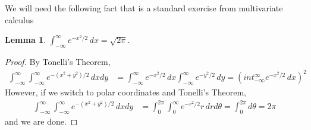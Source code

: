 \documentclass{amsart}
\newtheorem{lem}[thm]{Lemma}
\theoremstyle{remark}
\theoremstyle{definition}
\begin{document}
We will need the following fact that is a standard exercise from multivariate calculus
\begin{lem}\label{IntegralGaussian}$\int_{-\infty}^\infty e^{-x^2/2}\, dx = \sqrt{2\pi}$.
\end{lem}
\begin{proof}
By Tonelli's Theorem,
\begin{align*}
\int_{-\infty}^\infty \int_{-\infty}^\infty e^{-(x^2 + y^2)/2} \, dxdy
&= \int_{-\infty}^\infty e^{-x^2/2} \,
dx \int_{-\infty}^\infty e^{-y^2/2} \,
dy = \left(int_{-\infty}^\infty e^{-x^2/2} \,
dx \right)^2
\end{align*}
However, if we switch to polar coordinates and Tonelli's Theorem,
\begin{align*}
\int_{-\infty}^\infty \int_{-\infty}^\infty e^{-(x^2 + y^2)/2} \, dxdy
&= \int_{0}^{2\pi} \int_{0}^\infty e^{-r^2/2} r \, dr d\theta =
\int_{0}^{2\pi} d\theta = 2\pi
\end{align*}
and we are done.
\end{proof}
\end{document}
